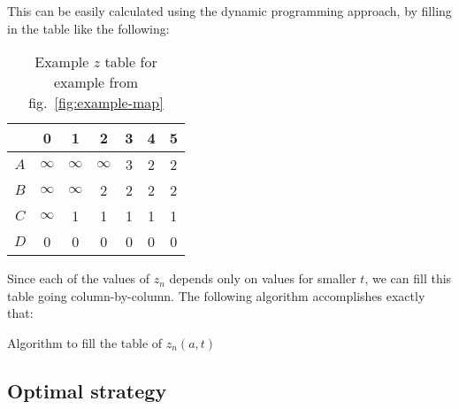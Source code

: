 \documentclass[12pt]{article}
\begin{document}
This can be easily calculated using the dynamic programming approach, by filling in the table like the following:

\begin{table}\centering
    \begin{tabular}{|c|c c c c c c|}
        \hline
            & 0        & 1        & 2        & 3 & 4 & 5 \\ \hline
        $A$ & $\infty$ & $\infty$ & $\infty$ & 3 & 2 & 2 \\
        $B$ & $\infty$ & $\infty$ & 2        & 2 & 2 & 2 \\
        $C$ & $\infty$ & 1        & 1        & 1 & 1 & 1 \\
        $D$ & 0        & 0        & 0        & 0 & 0 & 0 \\ \hline
    \end{tabular}
    \caption{Example $z$ table for example from fig.~\ref{fig:example-map}}
\end{table}

Since each of the values of $z_n$ depends only on values for smaller $t$, we can fill this table going column-by-column.
The following algorithm accomplishes exactly that:

\begin{algorithm}[H]
    \DontPrintSemicolon
    \BlankLine
    \caption{Algorithm to fill the table of $z_n(a,t)$}
\end{algorithm}

\subsection{Optimal strategy}
\end{document}
